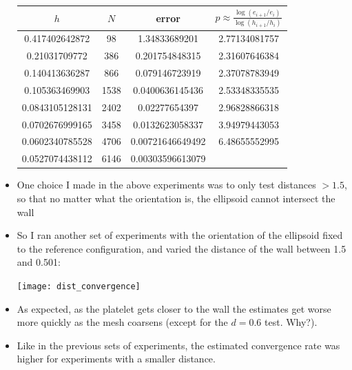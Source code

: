 \documentclass{article}
\begin{document}
\begin{itemize}
  \begin{center}
    \begin{tabular}{cccc} \toprule
      $h$ & $N$ & error & $p \approx \frac{\log(e_{i+1} /
                          e_i)}{\log(h_{i+1} / h_i)}$ \\ \midrule
      0.417402642872 & 98 & 1.34833689201 & 2.77134081757 \\
      0.21031709772 & 386 & 0.201754848315 & 2.31607646384 \\
      0.140413636287 & 866 & 0.079146723919 & 2.37078783949 \\
      0.105363469903 & 1538 & 0.0400636145436 & 2.53348335535 \\
      0.0843105128131 & 2402 & 0.02277654397 & 2.96828866318 \\
      0.0702676999165 & 3458 & 0.0132623058337 & 3.94979443053 \\
      0.0602340785528 & 4706 & 0.00721646649492 & 6.48655552995 \\
      0.0527074438112 & 6146 & 0.00303596613079 &  \\ \bottomrule
    \end{tabular}
  \end{center}
\item One choice I made in the above experiments was to only test
  distances $> 1.5$, so that no matter what the orientation is, the
  ellipsoid cannot intersect the wall
\item So I ran another set of experiments with the orientation of the
  ellipsoid fixed to the reference configuration, and varied the
  distance of the wall between 1.5 and 0.501:

  \begin{center}
    \texttt{[image: dist\_convergence]}
  \end{center}
\item As expected, as the platelet gets closer to the wall the
  estimates get worse more quickly as the mesh coarsens (except for
  the $d = 0.6$ test. Why?).
\item Like in the previous sets of experiments, the estimated
  convergence rate was higher for experiments with a smaller distance.


\end{itemize}
\end{document}
